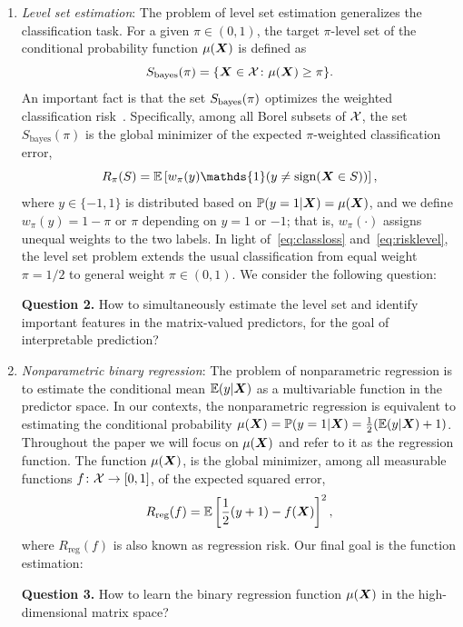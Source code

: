 \documentclass[11pt]{article}
\theoremstyle{plain}
\theoremstyle{definition}
\def\sign{\textup{sign}}
\def\bayesS{S_{\textup{bayes}}}
\begin{document}
\begin{enumerate}[label={2.\arabic*},wide, labelwidth=!, labelindent=0pt]
\item {\it Level set estimation}: The problem of level set estimation generalizes the classification task. For a given $\pi\in(0, 1)$, the target $\pi$-level set of the conditional probability function $\mu(\bm X)$ is defined as
\begin{equation}\label{eq:level}
\bayesS(\pi) = \{\mX\in\tX \colon \mu(\mX)\geq \pi\}.
\end{equation}
An important fact is that the set $\bayesS(\pi)$ optimizes the weighted classification risk~\citep{willett2007minimax,scott2007regression,wang2008probability}. Specifically, among all Borel subsets of $\mathcal{X}$, the set $S_{\text{bayes}}(\pi)$ is the global minimizer of the expected $\pi$-weighted classification error,
\begin{equation}\label{eq:risklevel}
R_\pi(S)=\mathbb{E}\left[ w_{\pi}(y)\mathds{1}(y\neq \sign(\mX\in S))\right],
\end{equation}
where $y\in\{-1,1\}$ is distributed based on $\mathbb{P}(y=1|\bm X)=\mu(\bm X)$, and we define $w_{\pi}(y)=1-\pi$ or $\pi$ depending on $y=1$ or $-1$; that is, $w_\pi(\cdot)$ assigns unequal weights to the two labels. In light of~\eqref{eq:classloss} and~\eqref{eq:risklevel}, the level set problem extends the usual classification from equal weight $\pi=1/2$ to general weight $\pi \in(0,1)$. %
We consider the following question:

{\bf Question 2.} How to simultaneously estimate the level set and identify important features in the matrix-valued predictors, for the goal of interpretable prediction?


\item {\it Nonparametric binary regression}: The problem of nonparametric regression is to estimate the conditional mean $\mathbb{E}(y|\bm X)$ as a multivariable function in the predictor space. In our contexts, the nonparametric regression is equivalent to estimating the conditional probability $\mu(\bm X)=\mathbb{P}(y=1|\bm X)=\frac{1}{2}(\mathbb{E}(y|\bm X)+1)$. Throughout the paper we will focus on $\mu(\bm X)$ and refer to it as the regression function. 
The function $\mu(\bm X)$, is the global minimizer, among all measurable functions $f\colon \mathcal{X}\to[0,1]$, of the expected squared error,
\begin{equation}\label{eq:regression}
R_{\text{reg}}(f)=\mathbb{E}\left[{1\over 2}(y+1)-f(\bm X)\right]^2,
\end{equation}
where $R_{\text{reg}}(f)$ is also known as regression risk. Our final goal is the function estimation:

{\bf Question 3.} How to learn the binary regression function $\mu(\bm X)$ in the high-dimensional matrix space?
\end{enumerate}
\end{document}
